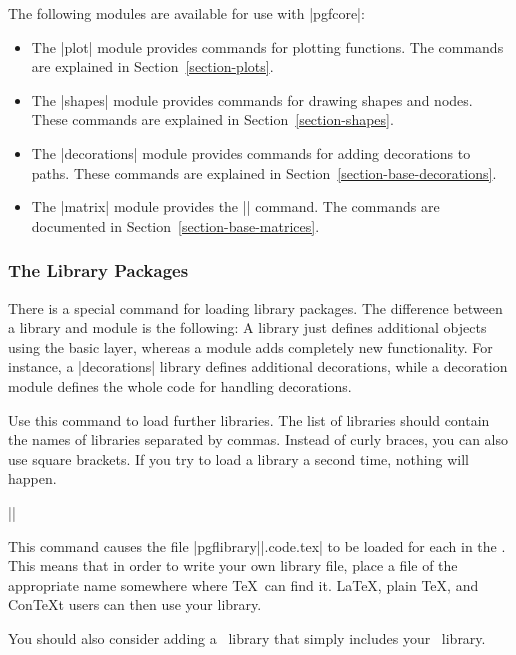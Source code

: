 The following modules are available for use with |pgfcore|: 
%
\begin{itemize}
    \item The |plot| module provides commands for plotting functions. The
        commands are explained in Section~\ref{section-plots}.
    \item The |shapes| module provides commands for drawing shapes and nodes.
        These commands are explained in Section~\ref{section-shapes}.
    \item The |decorations| module provides commands for adding decorations to
        paths. These commands are explained in
        Section~\ref{section-base-decorations}.
    \item The |matrix| module provides the |\pgfmatrix| command. The commands
        are documented in Section~\ref{section-base-matrices}.
\end{itemize}


\subsubsection{The Library Packages}

There is a special command for loading library packages. The difference between
a library and module is the following: A library just defines additional
objects using the basic layer, whereas a module adds completely new
functionality. For instance, a |decorations| library defines additional
decorations, while a decoration module defines the whole code for handling
decorations.

\begin{command}{\usepgflibrary{}}
    Use this command to load further libraries. The list of libraries should
    contain the names of libraries separated by commas. Instead of curly
    braces, you can also use square brackets. If you try to load a library a
    second time, nothing will happen.

    \example ||

    This command causes the file |pgflibrary||.code.tex| to be
    loaded for each  in the . This means
    that in order to write your own library file, place a file of the
    appropriate name somewhere where \TeX\ can find it. \LaTeX, plain \TeX, and
    Con\TeX t users can then use your library.

    You should also consider adding a \tikzname\ library that simply includes
    your \pgfname\ library.
\end{command}


